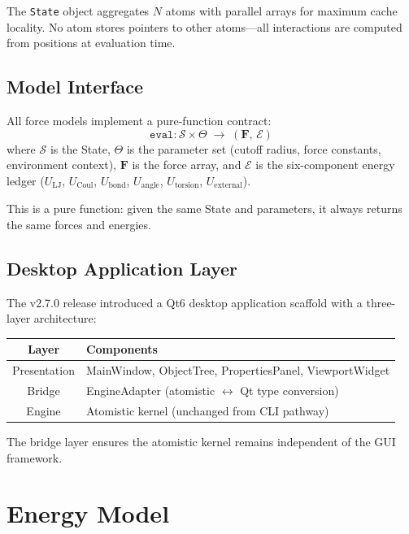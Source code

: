 \documentclass[11pt,twoside]{article}
\begin{document}
The \texttt{State} object aggregates $N$ atoms with parallel arrays for
maximum cache locality.  No atom stores pointers to other atoms---all
interactions are computed from positions at evaluation time.

\subsection{Model Interface}

All force models implement a pure-function contract:
\begin{equation}
  \texttt{eval} : \mathcal{S} \times \Theta \;\longrightarrow\; (\mathbf{F},\, \mathcal{E})
\end{equation}
where $\mathcal{S}$ is the State, $\Theta$ is the parameter set (cutoff
radius, force constants, environment context), $\mathbf{F}$ is the force
array, and $\mathcal{E}$ is the six-component energy ledger
($U_{\mathrm{LJ}}$, $U_{\mathrm{Coul}}$, $U_{\mathrm{bond}}$,
$U_{\mathrm{angle}}$, $U_{\mathrm{torsion}}$, $U_{\mathrm{external}}$).

This is a pure function: given the same State and parameters, it always
returns the same forces and energies.

\subsection{Desktop Application Layer}

The v2.7.0 release introduced a Qt6 desktop application scaffold with a
three-layer architecture:

\begin{center}
\begin{tabular}{cl}
\toprule
\textbf{Layer} & \textbf{Components} \\
\midrule
Presentation   & MainWindow, ObjectTree, PropertiesPanel, ViewportWidget \\
Bridge         & EngineAdapter (atomistic $\leftrightarrow$ Qt type conversion) \\
Engine         & Atomistic kernel (unchanged from CLI pathway) \\
\bottomrule
\end{tabular}
\end{center}

The bridge layer ensures the atomistic kernel remains independent of the GUI
framework.


\section{Energy Model}
\label{sec:energy}
\end{document}

